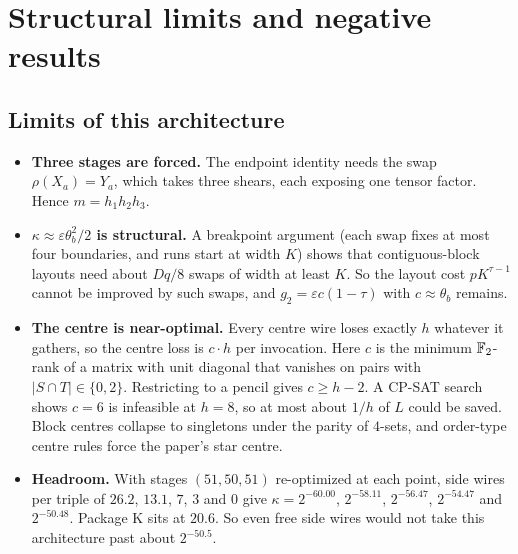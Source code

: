\section{Structural limits and negative results}\label{sec:limits}

\subsection{Limits of this architecture}
\begin{itemize}[leftmargin=*]
\item \textbf{Three stages are forced.} The endpoint identity needs the swap $\rho(X_a) = Y_a$, which takes three shears, each exposing one tensor factor. Hence $m = h_1h_2h_3$.
\item \textbf{$\kappa\approx\varepsilon\theta_b^2/2$ is structural.} A breakpoint argument (each swap fixes at most four boundaries, and runs start at width $K$) shows that contiguous-block layouts need about $Dq/8$ swaps of width at least $K$. So the layout cost $pK^{\tau-1}$ cannot be improved by such swaps, and $g_2 = \varepsilon c(1-\tau)$ with $c\approx\theta_b$ remains.
\item \textbf{The centre is near-optimal.} Every centre wire loses exactly $h$ whatever it gathers, so the centre loss is $c\cdot h$ per invocation. Here $c$ is the minimum $\mathbb{F}_2$-rank of a matrix with unit diagonal that vanishes on pairs with $|S\cap T|\in\{0,2\}$. Restricting to a pencil gives $c\ge h-2$. A CP-SAT search shows $c = 6$ is infeasible at $h = 8$, so at most about $1/h$ of $L$ could be saved. Block centres collapse to singletons under the parity of $4$-sets, and order-type centre rules force the paper's star centre.
\item \textbf{Headroom.} With stages $(51,50,51)$ re-optimized at each point, side wires per triple of $26.2$, $13.1$, $7$, $3$ and $0$ give $\kappa = 2^{-60.00}$, $2^{-58.11}$, $2^{-56.47}$, $2^{-54.47}$ and $2^{-50.48}$. Package K sits at $20.6$. So even free side wires would not take this architecture past about $2^{-50.5}$.
\end{itemize}

